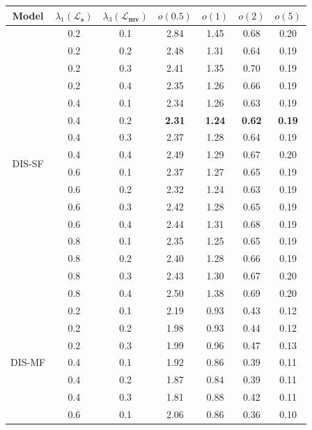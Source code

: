 \begin{table}[t]
    \begin{center}
        \begin{tabular}{c|cc|cccc}
        \hline
        Model & $\lambda_{1} (\boldsymbol{\mathcal{L}_s})$ & $\lambda_{3} (\boldsymbol{\mathcal{L}_{mv}})$ & $o(0.5)$ & $o(1)$ & $o(2)$ & $o(5)$ \\
        \hline
        \multirow{16}{75pt}{\centering DIS-SF} & 0.2 & 0.1 & 2.84 & 1.45 & 0.68 & 0.20 \\
        & 0.2 & 0.2 & 2.48 & 1.31 & 0.64 & 0.19 \\
        & 0.2 & 0.3 & 2.41 & 1.35 & 0.70 & 0.19 \\
        & 0.2 & 0.4 & 2.35 & 1.26 & 0.66 & 0.19 \\
        & 0.4 & 0.1 & 2.34 & 1.26 & 0.63 & 0.19 \\
        & 0.4 & 0.2 & \textbf{2.31} & \textbf{1.24} & \textbf{0.62} & \textbf{0.19} \\
        & 0.4 & 0.3 & 2.37 & 1.28 & 0.64 & 0.19 \\
        & 0.4 & 0.4 & 2.49 & 1.29 & 0.67 & 0.20 \\
        & 0.6 & 0.1 & 2.37 & 1.27 & 0.65 & 0.19 \\
        & 0.6 & 0.2 & 2.32 & 1.24 & 0.63 & 0.19 \\
        & 0.6 & 0.3 & 2.42 & 1.28 & 0.65 & 0.19 \\
        & 0.6 & 0.4 & 2.44 & 1.31 & 0.68 & 0.19 \\
        & 0.8 & 0.1 & 2.35 & 1.25 & 0.65 & 0.19 \\
        & 0.8 & 0.2 & 2.40 & 1.28 & 0.66 & 0.19 \\
        & 0.8 & 0.3 & 2.43 & 1.30 & 0.67 & 0.20 \\
        & 0.8 & 0.4 & 2.50 & 1.38 & 0.69 & 0.20 \\
        \hline
        \hline
        \multirow{15}{75pt}{\centering DIS-MF} & 0.2 & 0.1 & 2.19 & 0.93 & 0.43 & 0.12 \\
        & 0.2 & 0.2 & 1.98 & 0.93 & 0.44 & 0.12 \\
        & 0.2 & 0.3 & 1.99 & 0.96 & 0.47 & 0.13 \\
        & 0.4 & 0.1 & 1.92 & 0.86 & 0.39 & 0.11 \\
        & 0.4 & 0.2 & 1.87 & 0.84 & 0.39 & 0.11 \\
        & 0.4 & 0.3 & 1.81 & 0.88 & 0.42 & 0.11 \\
        & 0.6 & 0.1 & 2.06 & 0.86 & 0.36 & 0.10 \\

\end{tabular}
\end{center}
\end{table}
